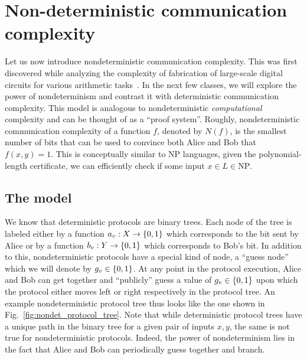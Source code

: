 \documentclass[letterpaper]{article}
\providecommand\cbrac[1]{\ensuremath \left\{#1\right\}}
\newcommand{\X}{X}
\newcommand{\Y}{Y}
\newcommand{\nf}{N(f)}
\begin{document}
\section{Non-deterministic communication complexity}

Let us now introduce nondeterministic communication complexity. This was first discovered while analyzing the complexity of fabrication of large-scale digital circuits for various arithmetic tasks~\cite{lipton1981lower}. In the next few classes, we will explore the power of nondeterminism and contrast it with deterministic communication complexity. This model is analogous to nondeterministic \emph{computational} complexity and can be thought of as a ``proof system''. Roughly, nondeterministic communication complexity of a function $f$, denoted by $\nf$, is the smallest number of bits that can be used to convince both Alice and Bob that $f(x,y) = 1$. This is conceptually similar to $\mathrm{NP}$ languages, given the polynomial-length certificate, we can efficiently check if some input $x \in L \in \mathrm{NP}$.

\subsection{The model}

We know that deterministic protocols are binary trees. Each node of the tree is labeled either by a function $a_v : \X \to \cbrac{0,1}$ which corresponds to the bit sent by Alice or by a function $b_v : \Y \to \cbrac{0,1}$ which corresponds to Bob's bit. In addition to this, nondeterministic protocols have a special kind of node, a ``guess node'' which we will denote by $g_v \in \cbrac{0,1}$. At any point in the protocol execution, Alice and Bob can get together and ``publicly'' guess a value of $g_v \in \cbrac{0,1}$ upon which the protocol either moves left or right respectively in the protocol tree. An example nondeterministic protocol tree thus looks like the one shown in Fig.~\ref{fig:nondet_protocol_tree}. Note that while deterministic protocol trees have a unique path in the binary tree for a given pair of inputs $x, y$, the same is not true for nondeterministic protocols. Indeed, the power of nondeterminism lies in the fact that Alice and Bob can periodically guess together and branch.
\end{document}
